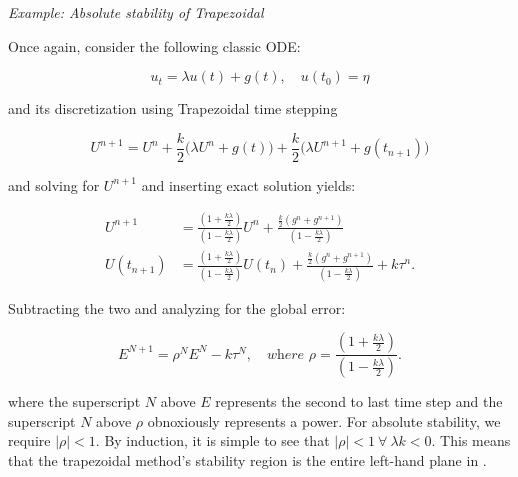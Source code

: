 \begin{tcolorbox}[colback=yellow!5!white,colframe=yellow!75!black]
    \textit{Example: Absolute stability of Trapezoidal}

    Once again, consider the following classic ODE: 

    \begin{equation}
        u_t = \lambda u(t) + g(t), \quad u(t_0) = \eta
    \end{equation}

    and its discretization using Trapezoidal time stepping

    \begin{equation}
        U^{n+1} = U^n + \frac{k}{2}\big(\lambda U^n +  g(t)\big) + \frac{k}{2}\big(\lambda U^{n+1} + g(t_{n+1})\big)
    \end{equation}

    and solving for $U^{n+1}$ and inserting exact solution yields:
    
    \begin{align}
        U^{n+1} &= \frac{(1+\frac{k\lambda}{2})}{(1-\frac{k\lambda}{2})} U^n + \frac{\frac{k}{2}(g^n + g^{n+1})}{(1-\frac{k\lambda}{2})} \\
        U(t_{n+1}) &= \frac{(1+\frac{k\lambda}{2})}{(1-\frac{k\lambda}{2})} U(t_{n}) + \frac{\frac{k}{2}(g^n + g^{n+1})}{(1-\frac{k\lambda}{2})} + k\tau^n. 
    \end{align}

    Subtracting the two and analyzing for the global error: 

    \begin{equation}
        E^{N+1} = \rho^N E^N - k\tau^N, \quad \textit{where } \rho = \frac{(1+\frac{k\lambda}{2})}{(1-\frac{k\lambda}{2})}.
    \end{equation}

    where the superscript $N$ above $E$ represents the second to last time step and the superscript $N$ above $\rho$ obnoxiously represents a power. For absolute stability, we require $|\rho| < 1$. By induction, it is simple to see that $|\rho| < 1 \ \forall \ \lambda k < 0$. This means that the trapezoidal method's stability region is the entire left-hand plane in . 

    

    
\end{tcolorbox}

